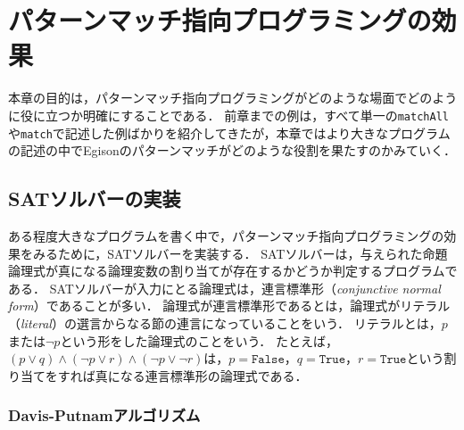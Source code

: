 \chapter{パターンマッチ指向プログラミングの効果}\label{essence}

本章の目的は，パターンマッチ指向プログラミングがどのような場面でどのように役に立つか明確にすることである．
前章までの例は，すべて単一の\lstinline{matchAll}や\lstinline{match}で記述した例ばかりを紹介してきたが，本章ではより大きなプログラムの記述の中でEgisonのパターンマッチがどのような役割を果たすのかみていく．

\section{SATソルバーの実装}\label{essence-sat}

ある程度大きなプログラムを書く中で，パターンマッチ指向プログラミングの効果をみるために，SATソルバーを実装する．
SATソルバーは，与えられた命題論理式が真になる論理変数の割り当てが存在するかどうか判定するプログラムである．
SATソルバーが入力にとる論理式は，連言標準形（\emph{conjunctive normal form}）であることが多い．
論理式が連言標準形であるとは，論理式がリテラル（\emph{literal}）の選言からなる節の連言になっていることをいう．
リテラルとは，$p$または$\neg p$という形をした論理式のことをいう．
たとえば，$(p \lor q) \wedge (\neg p \lor r) \wedge (\neg p \lor \neg r)$は，$p = \texttt{False}$，$q = \texttt{True}$，$r = \texttt{True}$という割り当てをすれば真になる連言標準形の論理式である．

\subsection{Davis-Putnamアルゴリズム}

